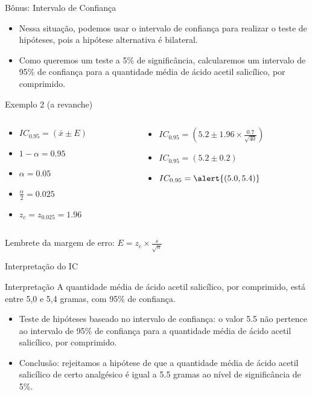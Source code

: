 \documentclass{beamer}
\begin{document}
\begin{frame}{Bônus: Intervalo de Confiança}
  \begin{itemize}
  \item Nessa situação, podemos usar o intervalo de confiança para
    realizar o teste de hipóteses, pois a hipótese alternativa é
    bilateral.
  \item Como queremos um teste a 5\% de significância, calcularemos um
    intervalo de 95\% de confiança para a quantidade média de ácido
    acetil salicílico, por comprimido.
  \end{itemize}
\end{frame}

\begin{frame}{Exemplo 2 (a revanche)}
  \begin{example}
    \begin{columns}
      \begin{column}{5cm}
        \begin{itemize}
        \item $IC_{0.95} = (\bar{x} \pm E)$
        \item $1-\alpha = 0.95$
        \item $\alpha = 0.05$
        \item $\frac{\alpha}{2} = 0.025$
        \item $z_c = z_{0.025} = 1.96$
        \end{itemize}
      \end{column}
      \begin{column}{5cm}
        \begin{itemize}
        \item $IC_{0.95} = (5.2 \pm 1.96 \times \frac{0.7}{\sqrt{40}})$
        \item $IC_{0.95} = (5.2 \pm 0.2)$
        \item $IC_{0.95} = \alert{(5.0 , 5.4)}$
        \end{itemize}
      \end{column}
    \end{columns}
  \end{example}

  Lembrete da margem de erro: $E = z_c \times\frac{s}{\sqrt{n}}$
\end{frame}

\begin{frame}{Interpretação do IC}
  \begin{block}{Interpretação}
    A quantidade média de ácido acetil salicílico, por comprimido,
    está entre 5,0 e 5,4 gramas, com 95\% de confiança.
  \end{block}
  \begin{itemize}
  \item Teste de hipóteses baseado no intervalo de confiança: o valor
    5.5 não pertence ao intervalo de 95\% de confiança para a
    quantidade média de ácido acetil salicílico, por comprimido.
  \item Conclusão: rejeitamos a hipótese de que a quantidade média de
    ácido acetil salicílico de certo analgésico é igual a 5.5 gramas
    ao nível de significância de 5\%.
  \end{itemize}
\end{frame}
\end{document}
